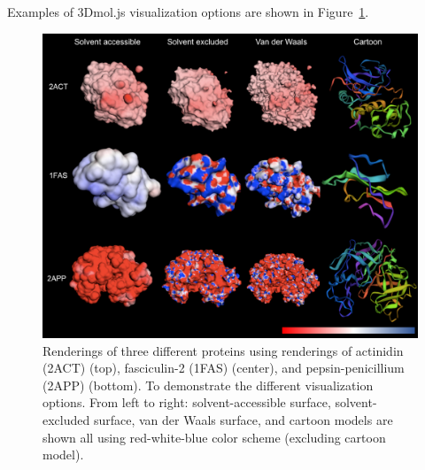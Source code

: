 \documentclass[12pt,titlepage]{article}
\begin{document}
Examples of 3Dmol.js visualization options are shown in Figure~\ref{fig:features}.
\begin{figure}
	\begin{center}
		\includegraphics[width=.75\paperwidth]{features}
		\caption{Renderings of three different proteins using renderings of actinidin (2ACT) (top), fasciculin-2 (1FAS) (center), and pepsin-penicillium (2APP) (bottom).
		To demonstrate the different visualization options.
		From left to right: solvent-accessible surface, solvent-excluded surface, van der Waals  surface, and cartoon models are shown all using red-white-blue color scheme (excluding cartoon model). \label{fig:features}}  
	\end{center}  
\end{figure}
\end{document}
